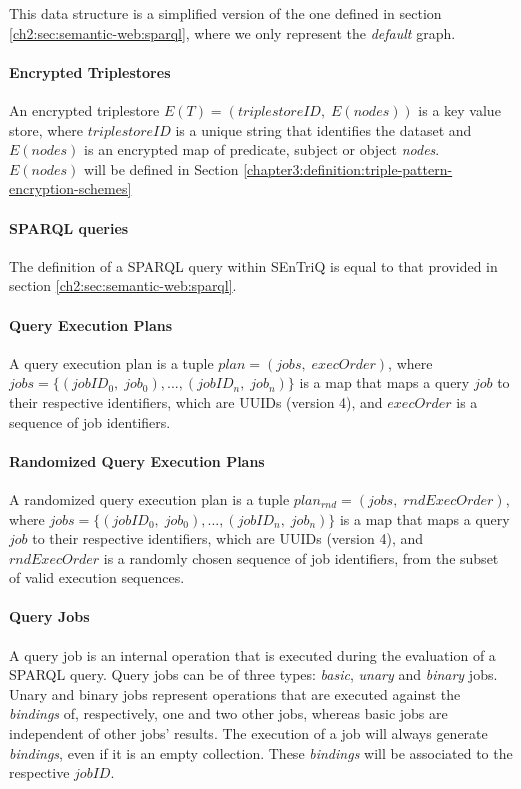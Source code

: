 This data structure is a simplified version of the one defined in section \ref{ch2:sec:semantic-web:sparql}, where we only represent the \emph{default} graph.

\paragraph{Encrypted Triplestores} An encrypted triplestore $E(T) = (triplestoreID,\; E(nodes))$ is a key value store, where $triplestoreID$ is a unique string that identifies the dataset and $E(nodes)$ is an encrypted map of predicate, subject or object \emph{nodes}. $E(nodes)$ will be defined in Section \ref{chapter3:definition:triple-pattern-encryption-schemes}

\paragraph{SPARQL queries} The definition of a \gls{SPARQL} query within \gls{SEnTriQ} is equal to that provided in section \ref{ch2:sec:semantic-web:sparql}.


\paragraph{Query Execution Plans} A query execution plan is a tuple $plan=(jobs, \;execOrder)$, where $jobs = \{(jobID_0, \; job_0),...,(jobID_n, \; job_n)\}$ is a map that maps a query $job$ to their respective identifiers, which are \gls{UUID}s (version 4), and $execOrder$ is a sequence of job identifiers.

\paragraph{Randomized Query Execution Plans} A randomized query execution plan is a tuple $plan_{rnd}=(jobs, \;rndExecOrder)$, where $jobs = \{(jobID_0, \; job_0),...,(jobID_n, \; job_n)\}$ is a map that maps a query $job$ to their respective identifiers, which are \gls{UUID}s (version 4), and $rndExecOrder$ is a randomly chosen sequence of job identifiers, from the subset of valid execution sequences.

\paragraph{Query Jobs} A query job is an internal operation that is executed during the evaluation of a \gls{SPARQL} query. Query jobs can be of three types: \emph{basic}, \emph{unary} and \emph{binary} jobs. Unary and binary jobs represent operations that are executed against the \emph{bindings} of, respectively, one and two other jobs, whereas basic jobs are independent of other jobs' results. The execution of a job will always generate \emph{bindings}, even if it is an empty collection. These \emph{bindings} will be associated to the respective $jobID$.

